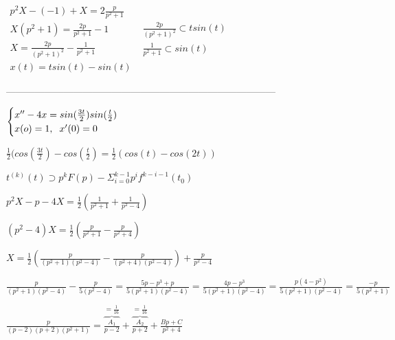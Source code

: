 \documentclass{article}
\begin{document}
\begin{large}
\vspace{0.5cm}
\begin{Large}
$
\begin{matrix}
p^2X - (-1)  + X = 2\frac{p}{p^2 + 1} \\
X(p^2+1) = \frac{2p}{p^2+1} - 1 \\
X = \frac{2p}{(p^2 + 1)^2} - \frac{1}{p^2 + 1} \\
x(t) = tsin(t) - sin(t)
\end{matrix}
$
\hspace{2cm}
$
\begin{matrix}
	 \frac{2p}{(p^2 + 1)^2}\subset tsin(t) \\
	 \frac{1}{p^2 + 1} \subset sin(t)
\end{matrix}
$

\end{Large}
------------------------------------------------------------------------------------

\begin{Large}
\vspace{0.5cm}
$
\begin{cases}
x^{\prime\prime} -4x = sin(\frac{3t}{2})sin(\frac{t}{2})
\\
x(o) = 1, 	\text{\hspace{0.2cm}} x^{\prime}(0) = 0
\end{cases}
$

\vspace{0.5cm}
$
\frac{1}{2}(cos(\frac{3t}{2}) - cos(\frac{t}{2}) = \frac{1}{2}(cos(t) - cos(2t))
$

\vspace{0.5cm}
$
t^{(k)}(t) \supset p^kF(p) - \Sigma_{i=0}^{k-1}p^if^{k-i-1}(t_0)
$

\vspace{0.5cm}
$
p^2X - p  - 4X = \frac{1}{2}(\frac{1}{p^2+1} +\frac{1}{p^2 - 4})
$

\vspace{0.5cm}
$
(p^2-4)X = \frac{1}{2}(\frac{p}{p^2+1} - \frac{p}{p^2+4})
$

\vspace{0.5cm}
$
X = \frac{1}{2}(\frac{p}{(p^2 + 1)(p^2 - 4)} - \frac{p}{(p^2 + 4)(p^2 -4)}) 
+
\frac{p}{p^2 - 4}
$


\vspace{0.5cm}
$
\frac{p}{(p^2+1)(p^2-4)} - \frac{p}{5(p^2 -4)} = \frac{5p - p^3 + p}{5(p^2+1)(p^2-4)}
= 
\frac{4p - p^3}{5(p^2+1)(p^2-4)}
= 
\frac{p(4-p^2)}{5(p^2+1)(p^2-4)}
=
\frac{-p}{5(p^2+1)}
$

\vspace{0.5cm}
$
\frac{p}{(p-2)(p+2)(p^2+1)} = \overbrace{\frac{A_1}{p-2}}^{=\frac{1}{16}}
 + 
\overbrace{\frac{A_2}{p+2}}^{=\frac{1}{16}}
+
\frac{Bp + C}{p^2 + 4}
$


\end{Large}
\end{large}
\end{document}
